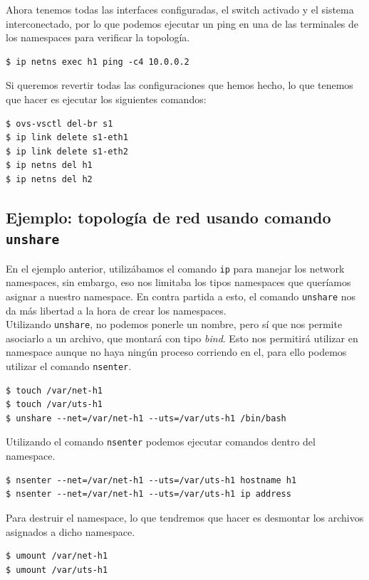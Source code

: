 \documentclass[12pt]{article}
\begin{document}
	\noindent Ahora tenemos todas las interfaces configuradas, el switch activado y el sistema interconectado, por lo que podemos ejecutar un ping en una de las terminales de los namespaces para verificar la topología.
	\begin{verbatim}
$ ip netns exec h1 ping -c4 10.0.0.2
	\end{verbatim}

	\noindent Si queremos revertir todas las configuraciones que hemos hecho, lo que tenemos que hacer es ejecutar los siguientes comandos:
	\begin{verbatim}
$ ovs-vsctl del-br s1
$ ip link delete s1-eth1
$ ip link delete s1-eth2
$ ip netns del h1
$ ip netns del h2
	\end{verbatim}

	\pagebreak

	\subsection{Ejemplo: topología de red usando comando \texttt{unshare}}
	\noindent En el ejemplo anterior, utilizábamos el comando \texttt{ip} para manejar los network namespaces, sin embargo, eso nos limitaba los tipos namespaces que queríamos asignar a nuestro namespace. En contra partida a esto, el comando \texttt{unshare} nos da más libertad a la hora de crear los namespaces. \\
	
	\noindent Utilizando \texttt{unshare}, no podemos ponerle un nombre, pero sí que nos permite asociarlo a un archivo, que montará con tipo \textit{bind}. Esto nos permitirá utilizar en namespace aunque no haya ningún proceso corriendo en el, para ello podemos utilizar el comando \texttt{nsenter}.
	\begin{verbatim}
$ touch /var/net-h1
$ touch /var/uts-h1
$ unshare --net=/var/net-h1 --uts=/var/uts-h1 /bin/bash
	\end{verbatim}

	\noindent Utilizando el comando \texttt{nsenter} podemos ejecutar comandos dentro del namespace.
	\begin{verbatim}
$ nsenter --net=/var/net-h1 --uts=/var/uts-h1 hostname h1
$ nsenter --net=/var/net-h1 --uts=/var/uts-h1 ip address
	\end{verbatim}

	\noindent Para destruir el namespace, lo que tendremos que hacer es desmontar los archivos asignados a dicho namespace.
	\begin{verbatim}
$ umount /var/net-h1
$ umount /var/uts-h1
	\end{verbatim}
\end{document}
